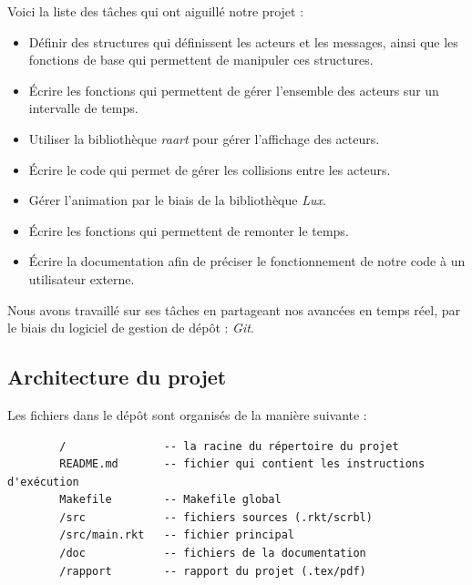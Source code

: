 \documentclass[a4paper,10pt]{article}
\begin{document}
Voici la liste des tâches qui ont aiguillé notre projet :\\
\begin{itemize}
    \item Définir des structures qui définissent les acteurs et les messages, ainsi que les fonctions de base qui permettent de manipuler ces structures.\\
    \item Écrire les fonctions qui permettent de gérer l'ensemble des acteurs sur un intervalle de temps.\\
    \item Utiliser la bibliothèque \textit{raart} pour gérer l'affichage des acteurs.\\
    \item Écrire le code qui permet de gérer les collisions entre les acteurs.\\
    \item Gérer l'animation par le biais de la bibliothèque \textit{Lux}.\\
    \item Écrire les fonctions qui permettent de remonter le     temps.\\
    \item Écrire la documentation afin de préciser le fonctionnement de notre code à un utilisateur externe.\\
    
\end{itemize}
Nous avons travaillé sur ses tâches en partageant nos avancées en temps réel, par le biais du logiciel de gestion de dépôt : \textit{Git}.

\subsection{Architecture du projet}

Les fichiers dans le dépôt sont organisés de la manière suivante :

\begin{center}
     \begin{verbatim}
        /               -- la racine du répertoire du projet
        README.md       -- fichier qui contient les instructions d'exécution
        Makefile        -- Makefile global
        /src            -- fichiers sources (.rkt/scrbl)
        /src/main.rkt   -- fichier principal
        /doc            -- fichiers de la documentation
        /rapport        -- rapport du projet (.tex/pdf)
    \end{verbatim}
\end{center}
\end{document}
